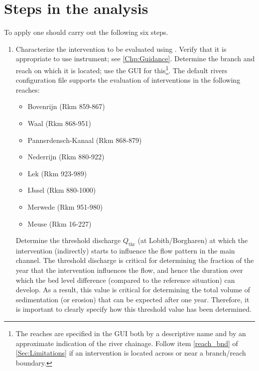 \chapter{Steps in the analysis}\label{Chp:steps}

To apply \dfastmi one should carry out the following six steps.

\begin{enumerate}
\item Characterize the intervention to be evaluated using \dfmi.
Verify that it is appropriate to use \dfmi instrument; see \autoref{Chp:Guidance}.
Determine the branch and reach on which it is located; use the \dfmi GUI for this\footnote{The reaches are specified in the GUI both by a descriptive name and by an approximate indication of the river chainage.
Follow item \ref{reach_bnd} of \autoref{Sec:Limitations} if an intervention is located across or near a branch/reach boundary.}.
The default  rivers configuration file supports the evaluation of interventions in the following reaches:
\begin{itemize}
\item Bovenrijn (Rkm 859-867)
\item Waal (Rkm 868-951)
\item Pannerdensch-Kanaal (Rkm 868-879)
\item Nederrijn (Rkm 880-922)
\item Lek (Rkm 923-989)
\item IJssel (Rkm 880-1000)
\item Merwede (Rkm 951-980)
\item Meuse (Rkm 16-227)
\end{itemize}
Determine the threshold discharge $Q_\text{thr}$ (at Lobith/Borgharen) at which the intervention (indirectly) starts to influence the flow pattern in the main channel.
The threshold discharge is critical for determining the fraction of the year that the intervention influences the flow, and hence the duration over which the bed level difference (compared to the reference situation) can develop.
As a result, this value is critical for determining the total volume of sedimentation (or erosion) that can be expected after one year.
Therefore, it is important to clearly specify how this threshold value has been determined.


\end{enumerate}
